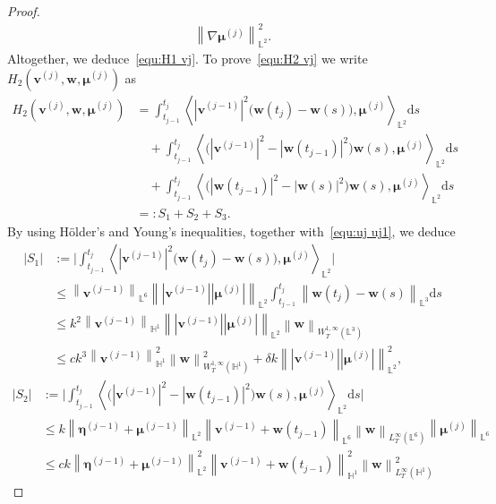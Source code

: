 \documentclass[11pt,reqno]{amsart}
\theoremstyle{definition}
\numberwithin{equation}{section}
\newcommand{\bff}{\boldsymbol}
\newcommand{\bb}{\mathbb}
\newcommand{\ds}{\mathrm{d}s}
\newcommand{\norm}[2]{\left\|{#1}\right\|_{#2}}
\newcommand{\inpro}[2]{\left\langle#1,#2\right\rangle}
\begin{document}
\begin{proof}
\begin{align*}
			\norm{\nabla\bff{\mu}^{(j)}}{\bb{L}^2}^2.
	\end{align*}
	Altogether, we deduce~\eqref{equ:H1 vj}. To prove~\eqref{equ:H2 vj} we
	write~$H_2(\bff{v}^{(j)},\bff{w},\bff{\mu}^{(j)})$ as
	\begin{align*} 
		H_2(\bff{v}^{(j)},\bff{w},\bff{\mu}^{(j)})
		&=
		\int_{t_{j-1}}^{t_j} 
		\inpro{|\bff{v}^{(j-1)}|^2
			\big(\bff{w}(t_j)-\bff{w}(s)\big)}{\bff{\mu}^{(j)}}_{\bb{L}^2}
		\ds
		\\
		&\quad
		+
		\int_{t_{j-1}}^{t_j} 
		\inpro{\big( |\bff{v}^{(j-1)}|^2 - |\bff{w}(t_{j-1})|^2 \big)
			\bff{w}(s)}{\bff{\mu}^{(j)}}_{\bb{L}^2} \ds
		\\
		&\quad
		+
		\int_{t_{j-1}}^{t_j} 
		\inpro{\big( |\bff{w}(t_{j-1})|^2 - |\bff{w}(s)|^2 \big)
			\bff{w}(s)}{\bff{\mu}^{(j)}}_{\bb{L}^2} \ds
		\\
		&=: S_1 + S_2 + S_3.
	\end{align*}
	By using H\"older's and Young's inequalities, together
	with~\eqref{equ:uj uj1}, we deduce
	\begin{align*} 
		|S_1|
		&:=
		\Big|
		\int_{t_{j-1}}^{t_j} 
		\inpro{|\bff{v}^{(j-1)}|^2
			\big(\bff{w}(t_j)-\bff{w}(s)\big)}{\bff{\mu}^{(j)}}_{\bb{L}^2}
		\Big|
		\\
		&\le
		\norm{\bff{v}^{(j-1)}}{\bb{L}^6} 
		\norm{|\bff{v}^{(j-1)}||\bff{\mu}^{(j)}|}{\bb{L}^2} 
		\int_{t_{j-1}}^{t_j} 
		\norm{\bff{w}(t_j)-\bff{w}(s)}{\bb{L}^3} \ds
		\\
		&\le
		k^2
		\norm{\bff{v}^{(j-1)}}{\bb{H}^1} 
		\norm{|\bff{v}^{(j-1)}||\bff{\mu}^{(j)}|}{\bb{L}^2} 
		\norm{\bff{w}}{W^{1,\infty}_T(\bb{L}^3)} 
		\\
		&\le
		ck^3
		\norm{\bff{v}^{(j-1)}}{\bb{H}^1}^2
		\norm{\bff{w}}{W^{1,\infty}_T(\bb{H}^1)}^2
		+
		\delta k
		\norm{|\bff{v}^{(j-1)}||\bff{\mu}^{(j)}|}{\bb{L}^2}^2,
	\end{align*}
	\begin{align*} 
		|S_2|
		&:=
		\Big|
		\int_{t_{j-1}}^{t_j} 
		\inpro{\big( |\bff{v}^{(j-1)}|^2 - |\bff{w}(t_{j-1})|^2 \big)
			\bff{w}(s)}{\bff{\mu}^{(j)}}_{\bb{L}^2} \ds
		\Big|
		\\
		&\le
		k
		\norm{\bff{\eta}^{(j-1)}+\bff{\mu}^{(j-1)}}{\bb{L}^2}
		\norm{\bff{v}^{(j-1)}+\bff{w}(t_{j-1})}{\bb{L}^6}
		\norm{\bff{w}}{L^\infty_T(\bb{L}^6)} 
		\norm{\bff{\mu}^{(j)}}{\bb{L}^6}
		\\
		&\le
		ck
		\norm{\bff{\eta}^{(j-1)}+\bff{\mu}^{(j-1)}}{\bb{L}^2}^2
		\norm{\bff{v}^{(j-1)}+\bff{w}(t_{j-1})}{\bb{H}^1}^2
		\norm{\bff{w}}{L^\infty_T(\bb{H}^1)}^2

\end{align*}
\end{proof}
\end{document}
